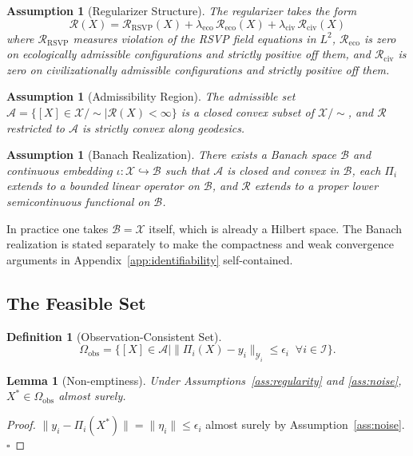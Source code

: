 \documentclass[12pt, oneside]{article}
\newtheorem{lemma}[theorem]{Lemma}
\newtheorem{definition}[theorem]{Definition}
\newtheorem{assumption}[theorem]{Assumption}
\newcommand{\Xmod}{\mathcal{X}/{\sim}}
\begin{document}
\begin{assumption}[Regularizer Structure]
\label{ass:regularizer}
The regularizer takes the form
\[
\mathcal{R}(X) = \mathcal{R}_{\mathrm{RSVP}}(X)
+ \lambda_{\mathrm{eco}}\,\mathcal{R}_{\mathrm{eco}}(X)
+ \lambda_{\mathrm{civ}}\,\mathcal{R}_{\mathrm{civ}}(X)
\]
where $\mathcal{R}_{\mathrm{RSVP}}$ measures violation of the RSVP field equations in
$L^2$, $\mathcal{R}_{\mathrm{eco}}$ is zero on ecologically admissible configurations
and strictly positive off them, and $\mathcal{R}_{\mathrm{civ}}$ is zero on
civilizationally admissible configurations and strictly positive off them.
\end{assumption}

\begin{assumption}[Admissibility Region]
\label{ass:admissibility}
The admissible set $\mathcal{A} = \{[X] \in \Xmod \mid \mathcal{R}(X) < \infty\}$
is a closed convex subset of $\Xmod$, and $\mathcal{R}$ restricted to $\mathcal{A}$
is strictly convex along geodesics.
\end{assumption}

\begin{assumption}[Banach Realization]
\label{ass:banach}
There exists a Banach space $\mathcal{B}$ and continuous embedding
$\iota : \mathcal{X} \hookrightarrow \mathcal{B}$ such that $\mathcal{A}$ is closed and
convex in $\mathcal{B}$, each $\Pi_i$ extends to a bounded linear operator on
$\mathcal{B}$, and $\mathcal{R}$ extends to a proper lower semicontinuous functional on
$\mathcal{B}$.
\end{assumption}

In practice one takes $\mathcal{B} = \mathcal{X}$ itself, which is already a Hilbert
space. The Banach realization is stated separately to make the compactness and weak
convergence arguments in Appendix~\ref{app:identifiability} self-contained.

\subsection{The Feasible Set}

\begin{definition}[Observation-Consistent Set]
\[
\Omega_{\mathrm{obs}} = \{ [X] \in \mathcal{A} \mid
\|\Pi_i(X) - y_i\|_{\mathcal{Y}_i} \le \epsilon_i \;\; \forall i \in \mathcal{I} \}.
\]
\end{definition}

\begin{lemma}[Non-emptiness]
Under Assumptions~\ref{ass:regularity} and \ref{ass:noise}, $X^* \in \Omega_{\mathrm{obs}}$
almost surely.
\end{lemma}
\begin{proof}
$\|y_i - \Pi_i(X^*)\| = \|\eta_i\| \le \epsilon_i$ almost surely by Assumption~\ref{ass:noise}.
$\square$
\end{proof}
\end{document}
